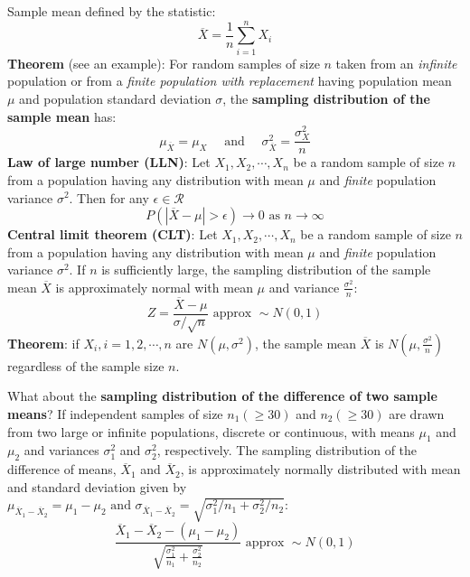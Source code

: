 \documentclass[a4paper]{article}
\begin{document}
\begin{enumerate}
Sample mean defined by the statistic:
\begin{equation}
\overline{X}=\frac{1}{n} \sum_{i=1}^{n} X_{i}
\end{equation}
\textbf{Theorem} (see an example): For random samples of size $n$ taken from an \textit{infinite} population or from a \textit{finite population with replacement} having population mean $\mu$ and population standard deviation $\sigma$, the \textbf{sampling distribution of the sample mean} has:
\begin{equation}
\mu_{\overline{X}}=\mu_{X} \quad \text { and } \quad \sigma_{\overline{X}}^{2}=\frac{\sigma_{X}^{2}}{n}
\end{equation}
\textbf{Law of large number (LLN)}: Let $X_1, X_2, \cdots, X_n$ be a random sample of size $n$ from a population having any distribution with mean $\mu$ and \textit{finite} population variance $\sigma ^ 2$. Then for any $\epsilon \in \mathcal{R}$
\begin{equation}
P(|\overline{X}-\mu|>\epsilon) \rightarrow 0 \text { as } n \rightarrow \infty
\end{equation}
\textbf{Central limit theorem (CLT)}: Let $X_1, X_2, \cdots, X_n$ be a random sample of size $n$ from a population having any distribution with mean $\mu$ and \textit{finite} population variance $\sigma ^ 2$. If $n$ is sufficiently large, the sampling distribution of the sample mean $\overline{X}$ is approximately normal with mean $\mu$ and variance $\frac{\sigma ^2 }{n}$:
\begin{equation}
Z=\frac{\overline{X}-\mu}{\sigma / \sqrt{n}} \text { approx } \sim N(0,1)
\end{equation}
\textbf{Theorem}: if $X_i, i=1,2,\cdots,n$ are $N\left(\mu, \sigma^{2}\right)$, the sample mean $\overline{X}$ is $N\left(\mu, \frac{\sigma^{2}}{n}\right)$ regardless of the sample size $n$.

What about the \textbf{sampling distribution of the difference of two sample means}?
If independent samples of size $n_1 (\geq 30)$ and $n_2 (\geq 30)$ are drawn from two large or infinite populations, discrete or continuous, with means $\mu_1$ and $\mu_2$ and variances $\sigma^2_1$ and $\sigma^2_2$, respectively. The sampling distribution of the difference of means, $\overline{X}_1$ and $\overline{X}_2$, is approximately normally distributed with mean and standard deviation given by 
$\mu_{\overline{X}_{1}-\overline{X}_{2}}=\mu_{1}-\mu_{2}  \text { and } \sigma_{\overline{X}_{1}-\overline{X}_{2}}=\sqrt{\sigma_{1}^{2} / n_{1}+\sigma_{2}^{2} / n_{2}}$:
\begin{equation}
\frac{\overline{X}_{1}-\overline{X}_{2}-\left(\mu_{1}-\mu_{2}\right)}{\sqrt{\frac{\sigma_{1}^{2}}{n_{1}}+\frac{\sigma_{2}^{2}}{n_{2}}}} \text { approx } \sim N(0,1)
\end{equation}


\end{enumerate}
\end{document}
